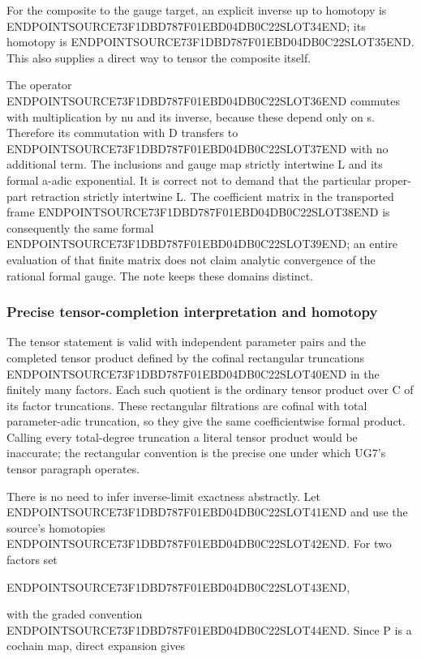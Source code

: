 For the composite to the gauge target, an explicit inverse up to homotopy is ENDPOINTSOURCE73F1DBD787F01EBD04DB0C22SLOT34END; its homotopy is ENDPOINTSOURCE73F1DBD787F01EBD04DB0C22SLOT35END. This also supplies a direct way to tensor the composite itself.

The operator ENDPOINTSOURCE73F1DBD787F01EBD04DB0C22SLOT36END commutes with multiplication by nu and its inverse, because these depend only on s. Therefore its commutation with D transfers to ENDPOINTSOURCE73F1DBD787F01EBD04DB0C22SLOT37END with no additional term. The inclusions and gauge map strictly intertwine L and its formal a-adic exponential. It is correct not to demand that the particular proper-part retraction strictly intertwine L. The coefficient matrix in the transported frame ENDPOINTSOURCE73F1DBD787F01EBD04DB0C22SLOT38END is consequently the same formal ENDPOINTSOURCE73F1DBD787F01EBD04DB0C22SLOT39END; an entire evaluation of that finite matrix does not claim analytic convergence of the rational formal gauge. The note keeps these domains distinct.

\subsubsection{Precise tensor-completion interpretation and homotopy}\label{endpoint-f1_unit_gauge_review--precise-tensor-completion-interpretation-and-homotopy}

The tensor statement is valid with independent parameter pairs and the completed tensor product defined by the cofinal rectangular truncations ENDPOINTSOURCE73F1DBD787F01EBD04DB0C22SLOT40END in the finitely many factors. Each such quotient is the ordinary tensor product over C of its factor truncations. These rectangular filtrations are cofinal with total parameter-adic truncation, so they give the same coefficientwise formal product. Calling every total-degree truncation a literal tensor product would be inaccurate; the rectangular convention is the precise one under which UG7's tensor paragraph operates.

There is no need to infer inverse-limit exactness abstractly. Let ENDPOINTSOURCE73F1DBD787F01EBD04DB0C22SLOT41END and use the source's homotopies ENDPOINTSOURCE73F1DBD787F01EBD04DB0C22SLOT42END. For two factors set

ENDPOINTSOURCE73F1DBD787F01EBD04DB0C22SLOT43END,

with the graded convention ENDPOINTSOURCE73F1DBD787F01EBD04DB0C22SLOT44END. Since P is a cochain map, direct expansion gives

